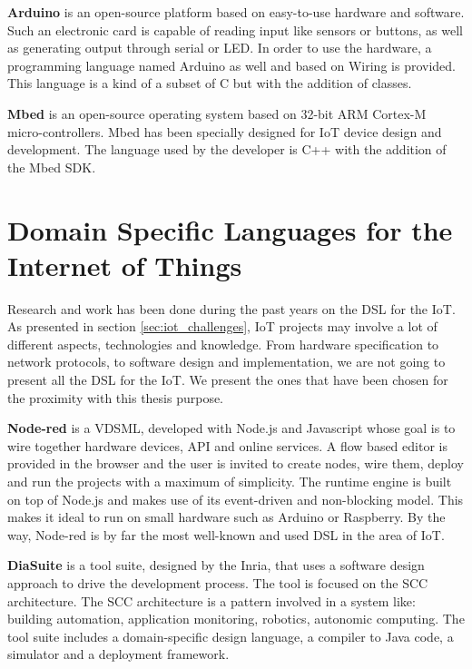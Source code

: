 \textbf{Arduino} is an open-source platform based on easy-to-use hardware and
software\cite{Arduino2017}. Such an electronic card is capable of reading input
like sensors or buttons, as well as generating output through serial or LED. In
order to use the hardware, a programming language named Arduino as well and
based on Wiring\cite{Arduino2017} is provided. This language is a kind of a
subset of C but with the addition of classes.

\textbf{Mbed} is an open-source operating system based on 32-bit ARM Cortex-M
micro-control\-lers\cite{Toulson:2012:FEE:2385440}. Mbed has been specially designed
for \gls{IoT} device design and development. The language used by the developer
is C++ with the addition of the Mbed SDK\cite{Toulson:2012:FEE:2385440}.

\section{Domain Specific Languages for the Internet of Things}
\label{sec:dsl_for_iot}

Research and work has been done during the past years on the \gls{DSL} for the
\gls{IoT}. As presented in section \ref{sec:iot_challenges}, \gls{IoT} projects may
involve a lot of different aspects, technologies and knowledge. From hardware
specification to network protocols, to software design and
implementation, we are not going to present all the \gls{DSL} for the \gls{IoT}.
We present the ones that have been chosen for the proximity with this thesis purpose.

\textbf{Node-red} is a \gls{VDSML}, developed with Node.js and
Javascript whose goal is to wire together hardware devices, API and online
services\cite{node-red}. A flow based editor is provided in the browser and
the user is invited to create nodes, wire them, deploy and run the projects
with a maximum of simplicity\cite{Salihbegovic2015}. The runtime engine is built
on top of Node.js and makes use of its event-driven and non-blocking model. This
makes it ideal to run on small hardware such as Arduino or
Raspberry\cite{node-red}. By the way, Node-red is by far the most well-known and
used \gls{DSL} in the area of \gls{IoT}.

\textbf{DiaSuite} is a tool suite, designed by the Inria, that uses a
software design approach to drive the development process\cite{Bertran2012}.
The tool is focused on the \gls{SCC} architecture. The \gls{SCC} architecture is
a pattern involved in a system like: building automation, application monitoring,
robotics, autonomic computing\cite{Taylor:2009:SAF:1538494}. The tool suite
includes a domain-specific design language, a compiler to Java code, a simulator
and a deployment framework. 

